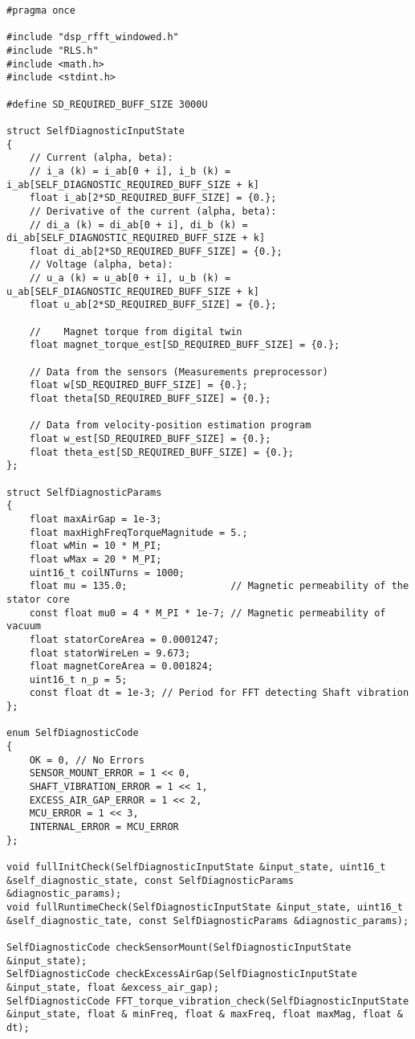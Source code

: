 \begin{lstlisting}[caption=\raggedright{mcu-libs/RLS.h}, frame=single]
#pragma once

#include "dsp_rfft_windowed.h"
#include "RLS.h"
#include <math.h>
#include <stdint.h>

#define SD_REQUIRED_BUFF_SIZE 3000U

struct SelfDiagnosticInputState
{
    // Current (alpha, beta):
    // i_a (k) = i_ab[0 + i], i_b (k) = i_ab[SELF_DIAGNOSTIC_REQUIRED_BUFF_SIZE + k]
    float i_ab[2*SD_REQUIRED_BUFF_SIZE] = {0.};
    // Derivative of the current (alpha, beta):
    // di_a (k) = di_ab[0 + i], di_b (k) = di_ab[SELF_DIAGNOSTIC_REQUIRED_BUFF_SIZE + k]
    float di_ab[2*SD_REQUIRED_BUFF_SIZE] = {0.};
    // Voltage (alpha, beta):
    // u_a (k) = u_ab[0 + i], u_b (k) = u_ab[SELF_DIAGNOSTIC_REQUIRED_BUFF_SIZE + k]
    float u_ab[2*SD_REQUIRED_BUFF_SIZE] = {0.};

    //    Magnet torque from digital twin
    float magnet_torque_est[SD_REQUIRED_BUFF_SIZE] = {0.};

    // Data from the sensors (Measurements preprocessor)
    float w[SD_REQUIRED_BUFF_SIZE] = {0.};
    float theta[SD_REQUIRED_BUFF_SIZE] = {0.};

    // Data from velocity-position estimation program
    float w_est[SD_REQUIRED_BUFF_SIZE] = {0.};
    float theta_est[SD_REQUIRED_BUFF_SIZE] = {0.};
};

struct SelfDiagnosticParams
{
    float maxAirGap = 1e-3;
    float maxHighFreqTorqueMagnitude = 5.;
    float wMin = 10 * M_PI;
    float wMax = 20 * M_PI;
    uint16_t coilNTurns = 1000;
    float mu = 135.0;                  // Magnetic permeability of the stator core
    const float mu0 = 4 * M_PI * 1e-7; // Magnetic permeability of vacuum
    float statorCoreArea = 0.0001247;
    float statorWireLen = 9.673;
    float magnetCoreArea = 0.001824;
    uint16_t n_p = 5;
    const float dt = 1e-3; // Period for FFT detecting Shaft vibration
};

enum SelfDiagnosticCode
{
    OK = 0, // No Errors
    SENSOR_MOUNT_ERROR = 1 << 0,
    SHAFT_VIBRATION_ERROR = 1 << 1,
    EXCESS_AIR_GAP_ERROR = 1 << 2,
    MCU_ERROR = 1 << 3,
    INTERNAL_ERROR = MCU_ERROR
};

void fullInitCheck(SelfDiagnosticInputState &input_state, uint16_t &self_diagnostic_state, const SelfDiagnosticParams &diagnostic_params);
void fullRuntimeCheck(SelfDiagnosticInputState &input_state, uint16_t &self_diagnostic_tate, const SelfDiagnosticParams &diagnostic_params);

SelfDiagnosticCode checkSensorMount(SelfDiagnosticInputState &input_state);
SelfDiagnosticCode checkExcessAirGap(SelfDiagnosticInputState &input_state, float &excess_air_gap);
SelfDiagnosticCode FFT_torque_vibration_check(SelfDiagnosticInputState &input_state, float & minFreq, float & maxFreq, float maxMag, float & dt);

\end{lstlisting}